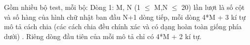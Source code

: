 Gồm nhiều bộ test, mỗi bộ: Dòng 1: M, N (1 $\le$ M,N $\le$ 20) lần lượt là số cột và số hàng của hình chữ nhật ban đầu N+1 dòng tiếp, mỗi dòng 4*M + 3 kí tự mô tả cách chia (các cách chia đều chính xác và có dạng hoàn toàn giống phía dưới) . Riêng dòng đầu tiên của mỗi mô tả chỉ có 4*M + 2 kí tự.

\